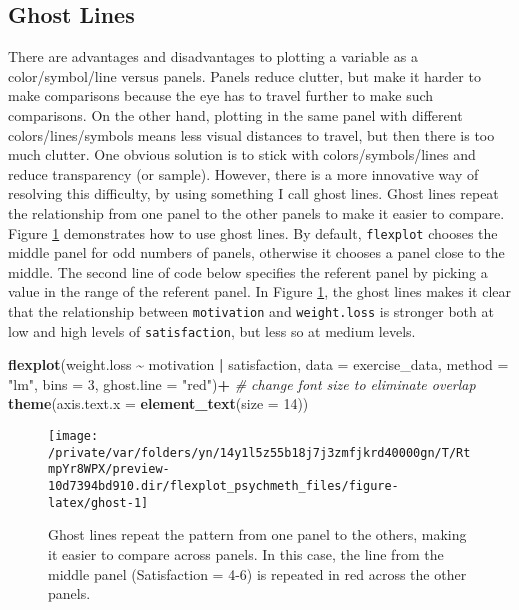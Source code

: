 \documentclass[
  english,
  man]{apa6}
\newenvironment{Shaded}{\begin{snugshade}}{\end{snugshade}}
\newcommand{\CommentTok}[1]{\textcolor[rgb]{0.56,0.35,0.01}{\textit{#1}}}
\newcommand{\DataTypeTok}[1]{\textcolor[rgb]{0.13,0.29,0.53}{#1}}
\newcommand{\DecValTok}[1]{\textcolor[rgb]{0.00,0.00,0.81}{#1}}
\newcommand{\KeywordTok}[1]{\textcolor[rgb]{0.13,0.29,0.53}{\textbf{#1}}}
\newcommand{\NormalTok}[1]{#1}
\newcommand{\OperatorTok}[1]{\textcolor[rgb]{0.81,0.36,0.00}{\textbf{#1}}}
\newcommand{\StringTok}[1]{\textcolor[rgb]{0.31,0.60,0.02}{#1}}
\begin{document}
\normalsize

\hypertarget{ghost-lines}{%
\subsection{Ghost Lines}\label{ghost-lines}}

There are advantages and disadvantages to plotting a variable as a color/symbol/line versus panels. Panels reduce clutter, but make it harder to make comparisons because the eye has to travel further to make such comparisons. On the other hand, plotting in the same panel with different colors/lines/symbols means less visual distances to travel, but then there is too much clutter. One obvious solution is to stick with colors/symbols/lines and reduce transparency (or sample). However, there is a more innovative way of resolving this difficulty, by using something I call ghost lines. Ghost lines repeat the relationship from one panel to the other panels to make it easier to compare. Figure \ref{fig:ghost} demonstrates how to use ghost lines. By default, \texttt{flexplot} chooses the middle panel for odd numbers of panels, otherwise it chooses a panel close to the middle. The second line of code below specifies the referent panel by picking a value in the range of the referent panel. In Figure \ref{fig:ghost}, the ghost lines makes it clear that the relationship between \texttt{motivation} and \texttt{weight.loss} is stronger both at low and high levels of \texttt{satisfaction}, but less so at medium levels.

\small

\begin{Shaded}
\begin{Highlighting}[]
\KeywordTok{flexplot}\NormalTok{(weight.loss }\OperatorTok{\textasciitilde{}}\StringTok{ }\NormalTok{motivation }\OperatorTok{|}\StringTok{ }\NormalTok{satisfaction, }
             \DataTypeTok{data =}\NormalTok{ exercise\_data, }\DataTypeTok{method =} \StringTok{"lm"}\NormalTok{, }
             \DataTypeTok{bins =} \DecValTok{3}\NormalTok{, }\DataTypeTok{ghost.line =} \StringTok{"red"}\NormalTok{)}\OperatorTok{+}
\StringTok{  }\CommentTok{\# change font size to eliminate overlap}
\StringTok{    }\KeywordTok{theme}\NormalTok{(}\DataTypeTok{axis.text.x =} 
            \KeywordTok{element\_text}\NormalTok{(}\DataTypeTok{size =} \DecValTok{14}\NormalTok{))}
\end{Highlighting}
\end{Shaded}

\begin{figure}

{\centering \texttt{[image: /private/var/folders/yn/14y1l5z55b18j7j3zmfjkrd40000gn/T/RtmpYr8WPX/preview-10d7394bd910.dir/flexplot\_psychmeth\_files/figure-latex/ghost-1]} 

}

\caption{Ghost lines repeat the pattern from one panel to the others, making it easier to compare across panels. In this case, the line from the middle panel (Satisfaction = 4-6) is repeated in red across the other panels. \label{fig:ghost}}\label{fig:ghost}
\end{figure}
\end{document}
